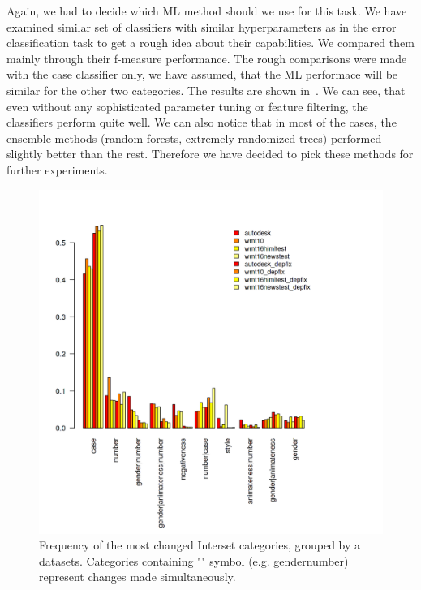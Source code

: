 Again, we had to decide which ML method should we use for this task. 
We have examined similar set of classifiers with similar
hyperparameters as in the error classification task to get a rough idea about their capabilities. We compared them mainly
through their f-measure performance.
The rough comparisons were made with the case classifier only,
we have assumed, that the ML performace will be similar for the other two categories.
The results are shown in~. We can see, that even without any sophisticated parameter
tuning or feature filtering, the classifiers perform quite well. We can also notice that in most of the cases, the ensemble
methods (random forests, extremely randomized trees) performed slightly better than the rest. Therefore we have decided
to pick these methods for further experiments.

\begin{figure}
\centering
  \includegraphics[scale=0.7]{iset}
  \caption{
    Frequency of the most changed Interset categories, grouped by a datasets. Categories containing
    "\textbar" symbol (e.g. gender\textbar{}number) represent changes made simultaneously.
}
  \label{iset-barplot}
\end{figure}

